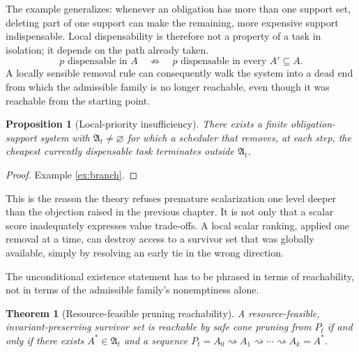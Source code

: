 \documentclass[11pt]{report}
\newtheorem{proposition}[definition]{Proposition}
\newtheorem{theorem}[definition]{Theorem}
\begin{document}
The example generalizes: whenever an obligation has more than one support set, deleting part of one support can make the remaining, more expensive support indispensable. Local dispensability is therefore not a property of a task in isolation; it depends on the path already taken.
\[
p \text{ dispensable in } A \quad \not\Longrightarrow \quad p \text{ dispensable in every } A' \subseteq A.
\]
A locally sensible removal rule can consequently walk the system into a dead end from which the admissible family is no longer reachable, even though it was reachable from the starting point.

\begin{proposition}[Local-priority insufficiency]
There exists a finite obligation-support system with $\mathfrak A_t \ne \varnothing$ for which a scheduler that removes, at each step, the cheapest currently dispensable task terminates outside $\mathfrak A_t$.
\end{proposition}
\begin{proof}
Example \ref{ex:branch}.
\end{proof}

This is the reason the theory refuses premature scalarization one level deeper than the objection raised in the previous chapter. It is not only that a scalar score inadequately expresses value trade-offs. A local scalar ranking, applied one removal at a time, can destroy access to a survivor set that was globally available, simply by resolving an early tie in the wrong direction.

The unconditional existence statement has to be phrased in terms of reachability, not in terms of the admissible family's nonemptiness alone.

\begin{theorem}[Resource-feasible pruning reachability]
A resource-feasible, invariant-preserving survivor set is reachable by safe cone pruning from $P_t$ if and only if there exists $A^\ast \in \mathfrak A_t$ and a sequence $P_t = A_0 \rightsquigarrow A_1 \rightsquigarrow \cdots \rightsquigarrow A_k = A^\ast$.
\end{theorem}
\end{document}
